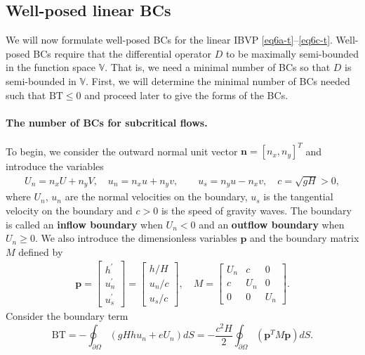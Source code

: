 \documentclass{article}
\numberwithin{equation}{section}
\theoremstyle{definition}
\begin{document}
\subsection{Well-posed linear BCs}
    We will now formulate well-posed BCs for the linear IBVP \eqref{eq6a-t}--\eqref{eq6c-t}.
Well-posed BCs require that the  differential operator $D$ to be  maximally semi-bounded in the function space $\mathbb{V}$. That is, we need a minimal number of BCs so that $D$ is semi-bounded in $\mathbb{V}$.  First,  we will determine the minimal number of BCs needed such that $\mathrm{BT} \le 0$  and proceed later  to give the forms of the BCs.

\paragraph{The number of  BCs for subcritical flows.}
To begin, we consider the outward normal unit vector $\mathbf{n} = [n_x, n_y]^T$ and  introduce the variables
\begin{align}
U_n = n_xU + n_y V, \quad u_n = n_xu + n_y v, \quad \quad u_s = n_yu - n_x v, \quad c = \sqrt{gH}>0,
\end{align}
where $U_n$, $u_n$ are the normal velocities on the boundary, $u_s$ is the tangential velocity on the boundary and $c>0$ is the speed of gravity waves. The boundary is called an \textbf{inflow boundary} when $U_n <0$ and an  \textbf{outflow boundary} when $U_n \ge 0$. We also introduce the dimensionless variables $\mathbf{p}$ and the boundary matrix $M$ defined by
\begin{align}
\mathbf{p}=
\begin{bmatrix}
    h^{\prime}\\
    u_n^{\prime}\\
    u_s^{\prime}
\end{bmatrix}
=
\begin{bmatrix}
    h/H\\
    u_n/c\\
    u_s/c
\end{bmatrix},
\quad 
M = \begin{bmatrix}
    U_n & c & 0\\
    c & U_n & 0\\
    0 & 0 & U_n
\end{bmatrix}.
\end{align}
Consider the boundary term
$$
\mathrm{BT} = -\oint_{\partial \Omega} \left(gHh{u}_n + e{U}_n\right) dS= -\frac{c^2H}{2}\oint_{\partial \Omega}{\left(
\mathbf{p}^TM\mathbf{p}\right)} dS.
$$
\end{document}
